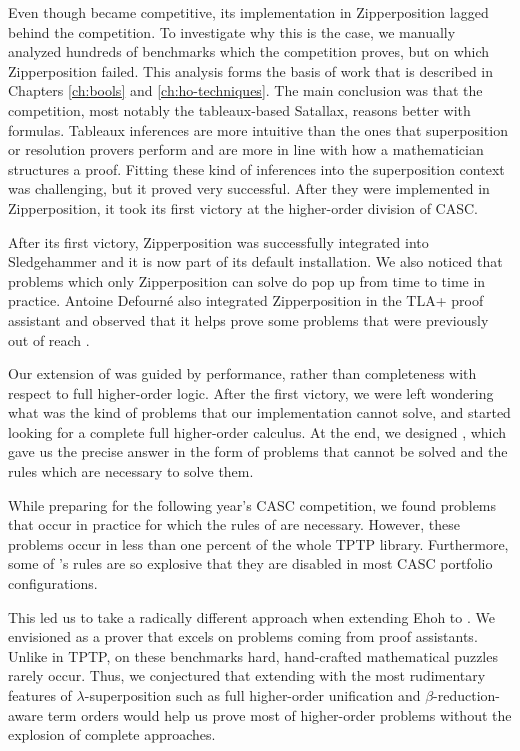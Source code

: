 Even though \lsup{} became competitive, its implementation in Zipperposition
lagged behind the competition. To investigate why this is the case,
we manually analyzed hundreds of benchmarks which the competition proves, but
on which Zipperposition failed. This analysis forms the basis of work that is
described in Chapters \ref{ch:bools} and \ref{ch:ho-techniques}. The main
conclusion was that the competition, most notably the tableaux-based Satallax,
reasons better with formulas. Tableaux inferences are more intuitive than the
ones that superposition or resolution provers perform and are more in line with
how a mathematician structures a proof. Fitting these kind of
inferences into the superposition context was challenging, but it proved very
successful. After they were implemented in Zipperposition, it took its first
victory at the higher-order division of CASC.

After its first victory, Zipperposition was successfully integrated into
Sledgehammer and it is now part of its default installation. We also noticed
that problems which only Zipperposition can solve do pop up from time to time in
practice. Antoine Defourné also integrated Zipperposition in the TLA+ proof
assistant and observed that it helps prove some problems that were previously
out of reach \cite{ad-21-ho-tlaplus}.

Our extension of \lsup{} was guided by performance, rather than completeness
with respect to full higher-order logic. After the first victory, we were left
wondering what was the kind of problems that our implementation cannot
solve, and started looking for a complete full higher-order calculus. At the end,
we designed \osup{}, which gave us the precise answer in the form of problems that
cannot be solved and the rules which are necessary to solve them. 

While preparing for the following year's CASC competition, we found problems
that occur in practice for which the rules of \osup{} are necessary. However,
these problems occur in less than one percent of the whole TPTP library.
Furthermore, some of \osup{}'s rules are so explosive that they are disabled in
most CASC portfolio configurations.

This led us to take a radically different approach when extending Ehoh to
\ehohii{}. We envisioned \ehohii{} as a prover that excels on problems coming
from proof assistants. Unlike in TPTP, on these benchmarks hard, hand-crafted mathematical puzzles rarely occur.
Thus, we conjectured that extending \lfsup{} with the most rudimentary features
of $\lambda$-superposition such as full higher-order unification and
$\beta$-reduction-aware term orders would help us prove most of higher-order
problems without the explosion of complete approaches.

